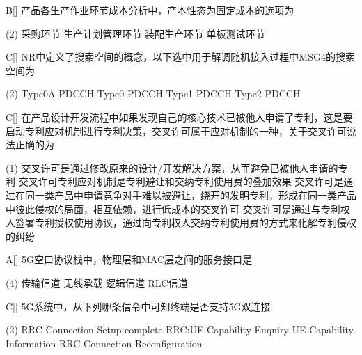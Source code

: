 \begin{choice}{B}[]
    产品各生产作业环节成本分析中，产本性态为固定成本的选项为
    \begin{tasks}(2)
        \task 采购环节
        \task 生产计划管理环节
        \task 装配生产环节
        \task 单板测试环节
    \end{tasks}
\end{choice}



\begin{choice}{C}[]
    NR中定义了搜索空间的概念，以下选中用于解调随机接入过程中MSG4的搜索空间为
    \begin{tasks}(2)
        \task Type0A-PDCCH
        \task Type0-PDCCH
        \task Type1-PDCCH
        \task Type2-PDCCH
    \end{tasks}
\end{choice}



\begin{choice}{C}[]
    在产品设计开发流程中如果发现自己的核心技术已被他人申请了专利，这是要启动专利应对机制进行专利决策，交叉许可属于应对机制的一种，关于交叉许可说法正确的为
    \begin{tasks}(1)
        \task  交叉许可是通过修改原来的设计/开发解决方案，从而避免已被他人申请的专利
        \task 交叉许可专利应对机制是专利避让和交纳专利使用费的叠加效果
        \task 交叉许可是通过在同一类产品中申请竞争对手难以被避让，绕开的发明专利，形成在同一类产品中彼此侵权的局面，相互依赖，进行低成本的交叉许可
        \task 交叉许可是通过与专利权人签署专利授权使用协议，通过向专利权人交纳专利使用费的方式来化解专利侵权的纠纷
    \end{tasks}
\end{choice}




\begin{choice}{A}[]
    5G空口协议栈中，物理层和MAC层之间的服务接口是
    \begin{tasks}(4)
        \task 传输信道
        \task 无线承载
        \task 逻辑信道
        \task RLC信道
    \end{tasks}
\end{choice}

\begin{choice}{C}[]
    5G系统中，从下列哪条信令中可知终端是否支持5G双连接
    \begin{tasks}(2)
        \task RRC Connection Setup complete
        \task RRC:UE Capability Enquiry
        \task UE Capability Information
        \task RRC Connection Reconfiguration
    \end{tasks}
\end{choice}

